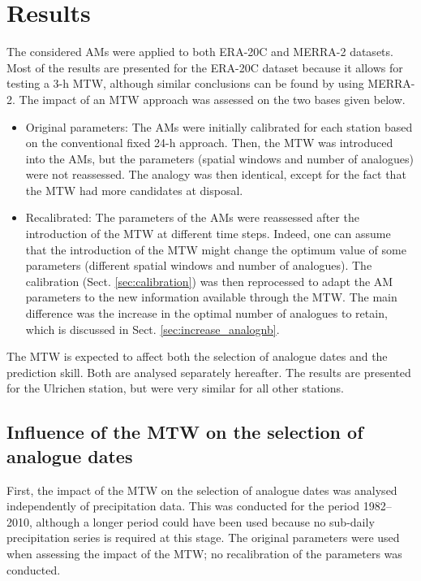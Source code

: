 \documentclass[hess, manuscript]{copernicus}
\begin{document}
	
	\section{Results}
	\label{sec:results}
	
	The considered AMs were applied to both ERA-20C and MERRA-2 datasets. Most of the results are presented for the ERA-20C dataset because it allows for testing a 3-h MTW, although similar conclusions can be found by using MERRA-2. The impact of an MTW approach was assessed on the two bases given below.
	\begin{itemize}
		\item Original parameters: The AMs were initially calibrated for each station based on the conventional fixed 24-h approach. Then, the MTW was introduced into the AMs, but the parameters (spatial windows and number of analogues) were not reassessed. The analogy was then identical, except for the fact that the MTW had more candidates at disposal.
		\item Recalibrated: The parameters of the AMs were reassessed after the introduction of the MTW at different time steps. Indeed, one can assume that the introduction of the MTW might change the optimum value of some parameters (different spatial windows and number of analogues). The calibration (Sect. \ref{sec:calibration}) was then reprocessed to adapt the AM parameters to the new information available through the MTW. The main difference was the increase in the optimal number of analogues to retain, which is discussed in Sect. \ref{sec:increase_analognb}.
	\end{itemize}
	
	The MTW is expected to affect both the selection of analogue dates and the prediction skill. Both are analysed separately hereafter. The results are presented for the Ulrichen station, but were very similar for all other stations.
	
	\subsection{Influence of the MTW on the selection of analogue dates}
	\label{sec:influence_analogue_dates}
	
	First, the impact of the MTW on the selection of analogue dates was analysed independently of precipitation data. This was conducted for the period 1982--2010, although a longer period could have been used because no sub-daily precipitation series is required at this stage. The original parameters were used when assessing the impact of the MTW; no recalibration of the parameters was conducted.
	
\end{document}
